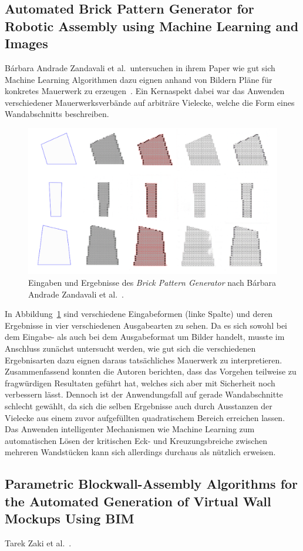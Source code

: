 \subsection{Automated Brick Pattern Generator for Robotic Assembly using Machine Learning and Images}
Bárbara Andrade Zandavali et al.\ untersuchen in ihrem Paper wie gut sich Machine Learning Algorithmen dazu eignen anhand von Bildern Pläne für konkretes Mauerwerk zu erzeugen~\cite{Zandavali2019}.
Ein Kernaspekt dabei war das Anwenden verschiedener Mauerwerksverbände auf arbiträre Vielecke, welche die Form eines Wandabschnitts beschreiben.
\begin{figure}[hb!]
    \centering
    \includegraphics[width=0.8\columnwidth]{fig/ecaadesigradi2019_605.png}
    \caption{Eingaben und Ergebnisse des \textit{Brick Pattern Generator} nach Bárbara Andrade Zandavali et al.~\cite{Zandavali2019}.}\label{fig:related:Zandavali2019}
\end{figure}
In Abbildung~\ref{fig:related:Zandavali2019} sind verschiedene Eingabeformen (linke Spalte) und deren Ergebnisse in vier verschiedenen Ausgabearten zu sehen.
Da es sich sowohl bei dem Eingabe- als auch bei dem Ausgabeformat um Bilder handelt, musste im Anschluss zunächst untersucht werden, wie gut sich die verschiedenen Ergebnisarten dazu eignen daraus tatsächliches Mauerwerk zu interpretieren.
Zusammenfassend konnten die Autoren berichten, dass das Vorgehen teilweise zu fragwürdigen Resultaten geführt hat, welches sich aber mit Sicherheit noch verbessern lässt.
Dennoch ist der Anwendungsfall auf gerade Wandabschnitte schlecht gewählt, da sich die selben Ergebnisse auch durch \glqq{}Ausstanzen\grqq{} der Vielecke aus einem zuvor aufgefüllten quadratischem Bereich erreichen lassen.
Das Anwenden intelligenter Mechanismen wie Machine Learning zum automatischen Lösen der kritischen Eck- und Kreuzungsbreiche zwischen mehreren Wandstücken kann sich allerdings durchaus als nützlich erweisen.

\subsection{Parametric Blockwall-Assembly Algorithms for the Automated Generation of Virtual Wall Mockups Using BIM}
Tarek Zaki et al.~\cite{Zaki2017}.